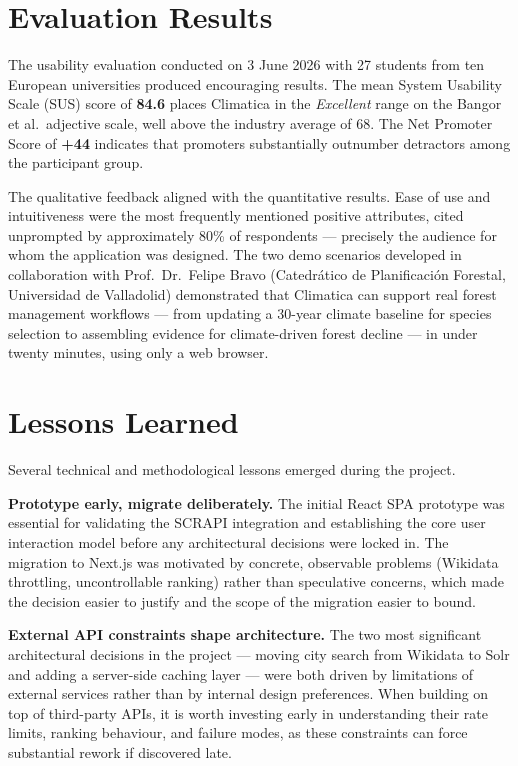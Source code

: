 \section{Evaluation Results}\label{CONC_EVAL}

The usability evaluation conducted on 3 June 2026 with 27 students from ten
European universities produced encouraging results. The mean System Usability
Scale (SUS) score of \textbf{84.6} places Climatica in the \emph{Excellent}
range on the Bangor et al.\ adjective scale, well above the industry average
of 68. The Net Promoter Score of \textbf{+44} indicates that promoters
substantially outnumber detractors among the participant group.

The qualitative feedback aligned with the quantitative results. Ease of use
and intuitiveness were the most frequently mentioned positive attributes,
cited unprompted by approximately 80\% of respondents --- precisely the
audience for whom the application was designed. The two demo scenarios
developed in collaboration with Prof.\ Dr.\ Felipe Bravo (Catedrático de
Planificación Forestal, Universidad de Valladolid) demonstrated that Climatica
can support real forest management workflows --- from updating a 30-year
climate baseline for species selection to assembling evidence for climate-driven
forest decline --- in under twenty minutes, using only a web browser.

\section{Lessons Learned}\label{CONC_LESSONS}

Several technical and methodological lessons emerged during the project.

\textbf{Prototype early, migrate deliberately.} The initial React SPA prototype
was essential for validating the SCRAPI integration and establishing the core
user interaction model before any architectural decisions were locked in. The
migration to Next.js was motivated by concrete, observable problems (Wikidata
throttling, uncontrollable ranking) rather than speculative concerns, which made
the decision easier to justify and the scope of the migration easier to bound.

\textbf{External API constraints shape architecture.} The two most significant
architectural decisions in the project --- moving city search from Wikidata to
Solr and adding a server-side caching layer --- were both driven by limitations
of external services rather than by internal design preferences. When building
on top of third-party APIs, it is worth investing early in understanding their
rate limits, ranking behaviour, and failure modes, as these constraints can
force substantial rework if discovered late.

